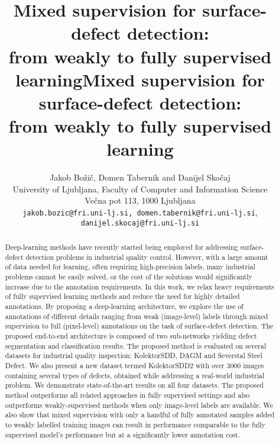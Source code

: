 \title{Mixed supervision for surface-defect detection:\\from weakly to fully supervised learning}



\title{Mixed supervision for surface-defect detection:\\from weakly to fully supervised learning}

\author{Jakob Bo\v{z}i\v{c}, Domen Tabernik and Danijel Sko\v{c}aj\\
University of Ljubljana, Faculty of Computer and Information Science\\
Ve\v{c}na pot 113, 1000 Ljubljana\\
{\tt\small jakob.bozic@fri.uni-lj.si, domen.tabernik@fri.uni-lj.si}, \\ 
{\tt\small danijel.skocaj@fri.uni-lj.si}
}

\maketitle

\begin{abstract}
Deep-learning methods have recently started being employed for addressing surface-defect detection problems in industrial quality control. However, with a large amount of data needed for learning, often requiring high-precision labels, many industrial problems cannot be easily solved, or the cost of the solutions would significantly increase due to the annotation requirements. In this work, we relax heavy requirements of fully supervised learning methods and reduce the need for highly detailed annotations. By proposing a deep-learning architecture, we explore the use of annotations of different details ranging from weak (image-level) labels through mixed supervision to full (pixel-level) annotations on the task of surface-defect detection. The proposed end-to-end architecture is composed of two sub-networks yielding defect segmentation and classification results. The proposed method is evaluated on several datasets for industrial quality inspection: KolektorSDD, DAGM and Severstal Steel Defect. We also present a new dataset termed KolektorSDD2 with over 3000 images containing several types of defects, obtained while addressing a real-world industrial problem. We demonstrate state-of-the-art results on all four datasets. The proposed method outperforms all related approaches in fully supervised settings and also outperforms weakly-supervised methods when only image-level labels are available. We also show that mixed supervision with only a handful of fully annotated samples added to weakly labelled training images can result in performance comparable to the fully supervised model's performance but at a significantly lower annotation cost.
\end{abstract}
\maketitle

